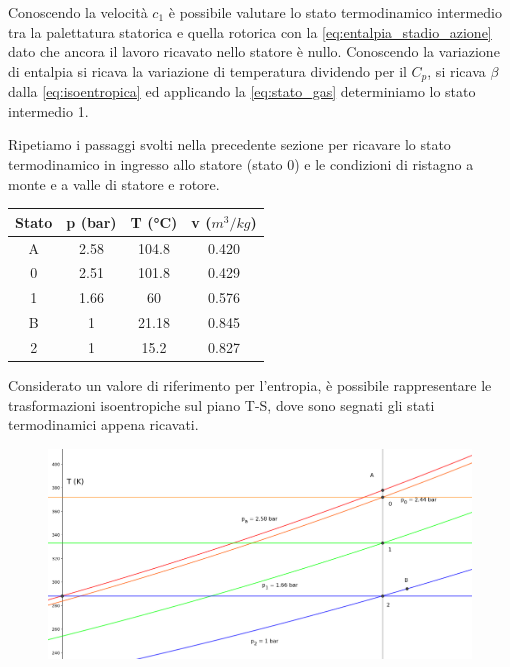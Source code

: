 \documentclass[a4paper,12pt]{article}
\begin{document}
Conoscendo la velocità $c_1$ è possibile valutare lo stato termodinamico intermedio tra la palettatura statorica e quella rotorica con la \eqref{eq:entalpia_stadio_azione}
dato che ancora il lavoro ricavato nello statore è nullo.
Conoscendo la variazione di entalpia si ricava la variazione di temperatura dividendo per il $C_p$, si ricava $\beta$ dalla \eqref{eq:isoentropica}
ed applicando la \eqref{eq:stato_gas} determiniamo lo stato intermedio 1.

Ripetiamo i passaggi svolti nella precedente sezione per ricavare lo stato termodinamico in ingresso allo statore (stato 0) e le
condizioni di ristagno a monte e a valle di statore e rotore.
\begin{center}
    \begin{tabular}{c|c|c|c}
        Stato   &p (bar)    &T (°C) &v ($m^3/kg$) \\ \hline
        A       &2.58       &104.8  &0.420  \\
        0       &2.51       &101.8  &0.429  \\
        1       &1.66       &60     &0.576  \\
        B       &1          &21.18  &0.845  \\
        2       &1          &15.2   &0.827  
    \end{tabular}
\end{center}

Considerato un valore di riferimento per l'entropia, è possibile rappresentare le trasformazioni isoentropiche sul piano T-S, dove sono segnati gli stati termodinamici
appena ricavati.
\begin{figure}[H]
    \label{fig:trasformazioni_TS_reazione}
    \centering
    \includegraphics[width=.99\linewidth]{media/trasformazioni_TS_reazione.png}
\end{figure}
\end{document}
